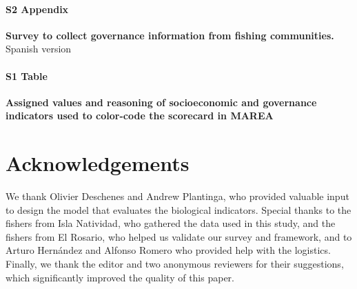 \documentclass[10pt,letterpaper]{article}
\begin{document}
\paragraph*{S2 Appendix}
\label{S2_Appendix}
{\bf Survey to collect governance information from fishing communities.} Spanish version

\paragraph*{S1 Table}
\label{S1_Table}
{\bf Assigned values and reasoning of socioeconomic and governance indicators used to color-code the scorecard in MAREA}

\section*{Acknowledgements}\label{acknowledgements}

We thank Olivier Deschenes and Andrew Plantinga, who provided valuable input to design the model that evaluates the biological indicators. Special thanks to the fishers from Isla Natividad, who gathered the data used in this study, and the fishers from El Rosario, who helped us validate our survey and framework, and to Arturo Hernández and Alfonso Romero who provided help with the logistics. Finally, we thank the editor and two anonymous reviewers for their suggestions, which significantly improved the quality of this paper.

\nolinenumbers
\end{document}
